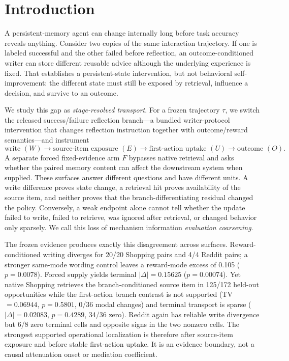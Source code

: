 \section{Introduction}
A persistent-memory agent can change internally long before task accuracy reveals anything. Consider two copies of the same interaction trajectory. If one is labeled successful and the other failed before reflection, an outcome-conditioned writer can store different reusable advice although the underlying experience is fixed. That establishes a persistent-state intervention, but not behavioral self-improvement: the different state must still be exposed by retrieval, influence a decision, and survive to an outcome.

We study this gap as \emph{stage-resolved transport}. For a frozen trajectory $\tau$, we switch the released success/failure reflection branch---a bundled writer-protocol intervention that changes reflection instruction together with outcome/reward semantics---and instrument
\[
\text{write }(W)\rightarrow\text{source-item exposure }(E)\rightarrow\text{first-action uptake }(U)\rightarrow\text{outcome }(O).
\]
A separate forced fixed-evidence arm $F$ bypasses native retrieval and asks whether the paired memory content can affect the downstream system when supplied. These surfaces answer different questions and have different units. A write difference proves state change, a retrieval hit proves availability of the source item, and neither proves that the branch-differentiating residual changed the policy. Conversely, a weak endpoint alone cannot tell whether the update failed to write, failed to retrieve, was ignored after retrieval, or changed behavior only sparsely. We call this loss of mechanism information \emph{evaluation coarsening}.

The frozen evidence produces exactly this disagreement across surfaces. Reward-conditioned writing diverges for 20/20 Shopping pairs and 4/4 Reddit pairs; a stronger same-mode wording control leaves a reward-mode excess of 0.105 ($p=0.0078$). Forced supply yields terminal $|\Delta|=0.15625$ ($p=0.00074$). Yet native Shopping retrieves the branch-conditioned source item in 125/172 held-out opportunities while the first-action branch contrast is not supported (TV $=0.06944$, $p=0.5801$, 0/36 modal changes) and terminal transport is sparse ($|\Delta|=0.02083$, $p=0.4289$, 34/36 zero). Reddit again has reliable write divergence but 6/8 zero terminal cells and opposite signs in the two nonzero cells. The strongest supported operational localization is therefore after source-item exposure and before stable first-action uptake. It is an evidence boundary, not a causal attenuation onset or mediation coefficient.

